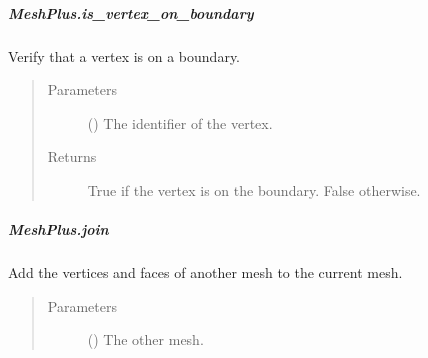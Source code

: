 \documentclass[letterpaper,10pt,english]{sphinxmanual}
\begin{document}
\begin{fulllineitems}
\begin{fulllineitems}
\begin{quote}
\begin{description}
\end{description}\end{quote}

\end{fulllineitems}



\subparagraph{MeshPlus.is\_vertex\_on\_boundary}
\label{\detokenize{api/generated/directional_clustering.mesh.MeshPlus.is_vertex_on_boundary:meshplus-is-vertex-on-boundary}}\label{\detokenize{api/generated/directional_clustering.mesh.MeshPlus.is_vertex_on_boundary::doc}}

\begin{fulllineitems}
\label{\detokenize{api/generated/directional_clustering.mesh.MeshPlus.is_vertex_on_boundary:directional_clustering.mesh.MeshPlus.is_vertex_on_boundary}}
Verify that a vertex is on a boundary.
\begin{quote}\begin{description}
\item[{Parameters}] \leavevmode
{} () \textendash{} The identifier of the vertex.

\item[{Returns}] \leavevmode
{} \textendash{} True if the vertex is on the boundary.
False otherwise.

\end{description}\end{quote}

\end{fulllineitems}



\subparagraph{MeshPlus.join}
\label{\detokenize{api/generated/directional_clustering.mesh.MeshPlus.join:meshplus-join}}\label{\detokenize{api/generated/directional_clustering.mesh.MeshPlus.join::doc}}

\begin{fulllineitems}
\label{\detokenize{api/generated/directional_clustering.mesh.MeshPlus.join:directional_clustering.mesh.MeshPlus.join}}
Add the vertices and faces of another mesh to the current mesh.
\begin{quote}\begin{description}
\item[{Parameters}] \leavevmode
{} () \textendash{} The other mesh.


\end{description}
\end{quote}
\end{fulllineitems}
\end{fulllineitems}
\end{document}
